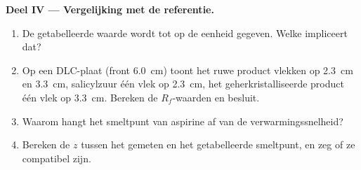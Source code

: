 \begin{problem}
\noindent\textbf{Deel IV --- Vergelijking met de referentie.}
\begin{enumerate}[resume]
  \item De getabelleerde waarde wordt tot op de eenheid gegeven. Welke
         impliceert dat?
  \item Op een DLC-plaat (front \qty{6.0}{cm}) toont het ruwe product
        vlekken op \qty{2.3}{cm} en \qty{3.3}{cm}, salicylzuur één vlek op
        \qty{2.3}{cm}, het geherkristalliseerde product één vlek op
        \qty{3.3}{cm}. Bereken de $R_f$-waarden en besluit.
  \item Waarom hangt het smeltpunt van aspirine af van de
        verwarmingssnelheid?
  \item Bereken de  $z$ tussen het gemeten en het
        getabelleerde smeltpunt, en zeg of ze compatibel zijn.
\end{enumerate}
\end{problem}
